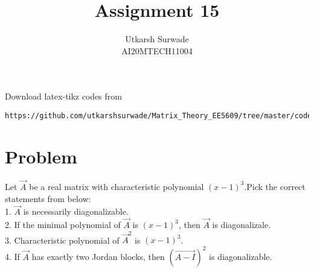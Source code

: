 \documentclass[journal,12pt]{IEEEtran}
\begin{document}
\def\putbox#1#2#3{\makebox[0in][l]{\makebox[#1][l]{}\raisebox{\baselineskip}[0in][0in]{\raisebox{#2}[0in][0in]{#3}}}}
     \def\rightbox#1{\makebox[0in][r]{#1}}
     \def\centbox#1{\makebox[0in]{#1}}
     \def\topbox#1{\raisebox{-\baselineskip}[0in][0in]{#1}}
     \def\midbox#1{\raisebox{-0.5\baselineskip}[0in][0in]{#1}}
\vspace{3cm}
\title{Assignment 15}
\author{Utkarsh Surwade\\AI20MTECH11004}
\maketitle
\bigskip
\renewcommand{\thefigure}{\theenumi}
\renewcommand{\thetable}{\theenumi}
Download latex-tikz codes from 
%
\begin{lstlisting}
https://github.com/utkarshsurwade/Matrix_Theory_EE5609/tree/master/codes
\end{lstlisting}
%
 
\section{\textbf{Problem}}
Let $\vec{A}$ be a real matrix with characteristic polynomial $(x-1)^3$.Pick the correct statements from below:\\
1. $\vec{A}$ is necessarily diagonalizable.\\
2. If the minimal polynomial of $\vec{A}$ is $(x-1)^3$, then $\vec{A}$ is diagonalizale.\\
3. Characteristic polynomial of $\vec{A}^2$ is $(x-1)^3$.\\
4. If $\vec{A}$ has exactly two Jordan blocks, then $(\vec{A-I})^2$ is diagonalizable.
\end{document}
